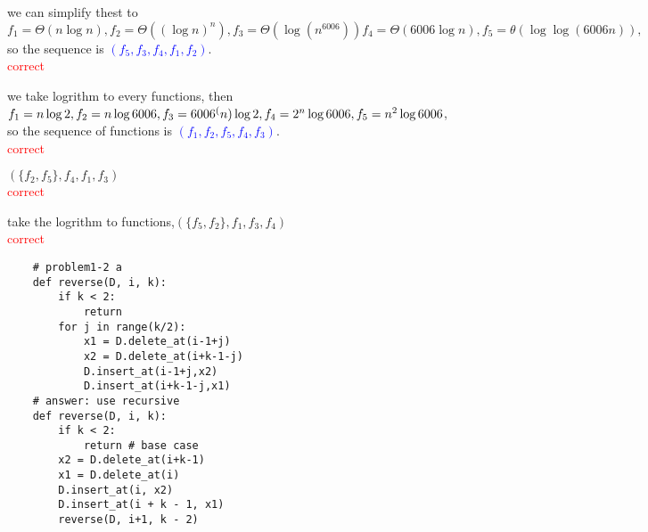 \documentclass[12pt,twoside]{article}
\begin{document}


\begin{problems}

\problem  %

\begin{problemparts}
\problempart %

we can simplify thest to 
$
f_1 = \Theta (n\log n), f_2 = \Theta ((\log n)^n), f_3 = \Theta(\log (n^6006)) 
f_4 = \Theta(6006\log n), f_5 = \theta(\log \log (6006n)),
$
so the sequence is \textcolor{blue}{$(f_5,f_3,f_4,f_1,f_2)$}.
\\ \textcolor{red}{correct}
\problempart %

we take logrithm to every functions, 
then $f_1=n\log 2, f_2 = n\log 6006, f_3 = 6006^(n)\log 2,\\
f_4 = 2^n \log6006, f_5 = n^2\log 6006$,
so the sequence of functions is \textcolor{blue}{$(f_1,f_2,f_5,f_4,f_3)$}.
\\ \textcolor{red}{correct}

\problempart %

$(\{f_2,f_5\},f_4,f_1,f_3)$
\\ \textcolor{red}{correct}

\problempart %

take the logrithm to functions,$(\{f_5,f_2\},f_1,f_3,f_4)$
\\ \textcolor{red}{correct}

\end{problemparts}

\newpage
\problem  %
\begin{problemparts}
\problempart %

\begin{lstlisting}
    # problem1-2 a
    def reverse(D, i, k):
        if k < 2:
            return
        for j in range(k/2):
            x1 = D.delete_at(i-1+j)
            x2 = D.delete_at(i+k-1-j)
            D.insert_at(i-1+j,x2)
            D.insert_at(i+k-1-j,x1)
    # answer: use recursive
    def reverse(D, i, k):
        if k < 2:
            return # base case
        x2 = D.delete_at(i+k-1)
        x1 = D.delete_at(i)
        D.insert_at(i, x2)
        D.insert_at(i + k - 1, x1)
        reverse(D, i+1, k - 2)
\end{lstlisting}


\end{problemparts}
\end{problems}
\end{document}
